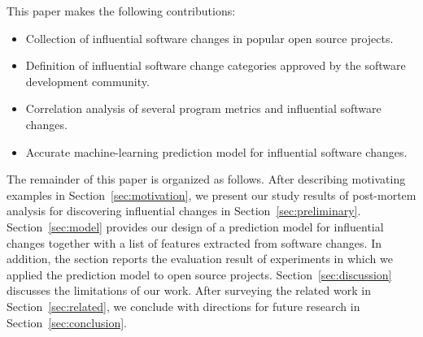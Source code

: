 This paper makes the following contributions:

\begin{itemize}
\itemsep0em 
	\item Collection of influential software changes in popular open source projects.
	\item Definition of influential software change categories approved by the software development community.
	\item Correlation analysis of several program metrics and influential software
changes.
	\item Accurate machine-learning prediction model for influential software changes.
\end{itemize}

The remainder of this paper is organized as follows. After describing motivating
examples in Section~\ref{sec:motivation}, we present our study results of
post-mortem analysis for discovering influential changes in
Section~\ref{sec:preliminary}.
Section~\ref{sec:model} provides our design of a prediction model for
influential changes together with a list of features extracted from software changes.
In addition, the section reports the evaluation result of experiments in which
we applied the prediction model to open source projects.
Section~\ref{sec:discussion} discusses the limitations of our work.
After surveying the related work in Section~\ref{sec:related}, 
we conclude with directions for future research in
Section~\ref{sec:conclusion}.
